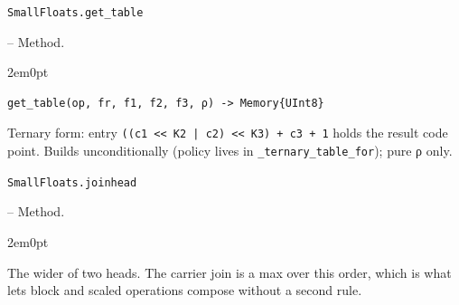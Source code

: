 \par\medskip\noindent\begin{minipage}{\linewidth}
\hypertarget{17468751084076810785}{\texttt{SmallFloats.get\_\allowbreak{}table}}  -- {Method.}
\nopagebreak
\begin{adjustwidth}{2em}{0pt}


\begin{verbatim}
get_table(op, fr, f1, f2, f3, ρ) -> Memory{UInt8}
\end{verbatim}

Ternary form: entry \texttt{(\allowbreak{}(\allowbreak{}c1 << K2 | c2) << K3) + c3 + 1} holds the result code point. Builds unconditionally (policy lives in \texttt{\_\allowbreak{}ternary\_\allowbreak{}table\_\allowbreak{}for}); pure ρ only.



\end{adjustwidth}
\end{minipage}
\par\medskip

\par\medskip\noindent\begin{minipage}{\linewidth}
\hypertarget{10981503898423870584}{\texttt{SmallFloats.joinhead}}  -- {Method.}
\nopagebreak
\begin{adjustwidth}{2em}{0pt}

The wider of two heads. The carrier join is a max over this order, which is what lets block and scaled operations compose without a second rule.



\end{adjustwidth}
\end{minipage}
\par\medskip

